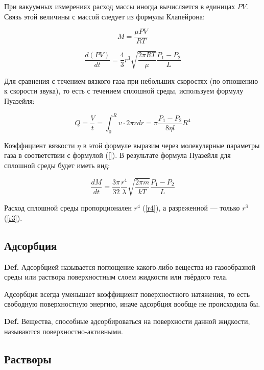 \documentclass[a4paper,12pt]{article} %
\begin{document}
При вакуумных измерениях расход массы иногда вычисляется в единицах $PV$. Связь этой величины с массой следует из формулы Клапейрона:

\begin{equation}
  M = \frac{\mu P V}{R T}
\end{equation}

\begin{equation}
  \frac{d(PV)}{dt} = \frac{4}{3} r^3 \sqrt{\frac{2 \pi R T}{\mu}} \frac{P_1 - P_2}{L}
\end{equation}

Для сравнения с течением вязкого газа при небольших скоростях (по отношению к скорости звука), то есть с течением сплошной среды, используем формулу Пуазейля:

\begin{equation}
  Q = \frac{V}{t} = \int_{0}^{R} v \cdot 2 \pi r dr = \pi \frac{P_1 - P_2}{8 \eta l} R^4
\end{equation}

Коэффициент вязкости $\eta$ в этой формуле выразим через молекулярные параметры газа в соответствии с формулой (\ref{}). В результате формула Пуазейля для сплошной среды будет иметь вид:

\begin{equation}
  \frac{d M}{d t} = \frac{3 \pi}{32} \frac{r^4}{\lambda} \sqrt{\frac{2 \pi m}{k T}} \frac{P_1 - P_2}{L}
  \label{r4}
\end{equation}

Расход сплошной среды пропорционален $r^4$ (\ref{r4}), а разреженной — только $r^3$ (\ref{r3}). 

\subsection*{Адсорбция}

\textbf{Def.} Адсорбцией называется поглощение какого-либо вещества из газообразной среды или раствора поверхностным слоем жидкости или твёрдого тела.

Адсорбция всегда уменьшает коэффициент поверхностного натяжения, то есть свободную поверхностную энергию, иначе адсорбция вообще не происходила бы.

\textbf{Def.} Вещества, способные адсорбироваться на поверхности данной жидкости, называются поверхностно-активными.

\subsection*{Растворы}
\end{document}
